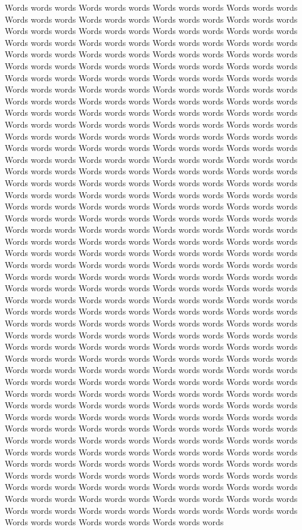 Words words words
Words words words
Words words words
Words words words
Words words words
Words words words
Words words words
Words words words
Words words words
Words words words
Words words words
Words words words
Words words words
Words words words
Words words words
Words words words
Words words words
Words words words
Words words words
Words words words
Words words words
Words words words
Words words words
Words words words
Words words words
Words words words
Words words words
Words words words
Words words words
Words words words
Words words words
Words words words
Words words words
Words words words
Words words words
Words words words
Words words words
Words words words
Words words words
Words words words
Words words words
Words words words
Words words words
Words words words
Words words words
Words words words
Words words words
Words words words
Words words words
Words words words
Words words words
Words words words
Words words words
Words words words
Words words words
Words words words
Words words words
Words words words
Words words words
Words words words
Words words words
Words words words
Words words words
Words words words
Words words words
Words words words
Words words words
Words words words
Words words words
Words words words
Words words words
Words words words
Words words words
Words words words
Words words words
Words words words
Words words words
Words words words
Words words words
Words words words
Words words words
Words words words
Words words words
Words words words
Words words words
Words words words
Words words words
Words words words
Words words words
Words words words
Words words words
Words words words
Words words words
Words words words
Words words words
Words words words
Words words words
Words words words
Words words words
Words words words
Words words words
Words words words
Words words words
Words words words
Words words words
Words words words
Words words words
Words words words
Words words words
Words words words
Words words words
Words words words
Words words words
Words words words
Words words words
Words words words
Words words words
Words words words
Words words words
Words words words
Words words words
Words words words
Words words words
Words words words
Words words words
Words words words
Words words words
Words words words
Words words words
Words words words
Words words words
Words words words
Words words words
Words words words
Words words words
Words words words
Words words words
Words words words
Words words words
Words words words
Words words words
Words words words
Words words words
Words words words
Words words words
Words words words
Words words words
Words words words
Words words words
Words words words
Words words words
Words words words
Words words words
Words words words
Words words words
Words words words
Words words words
Words words words
Words words words
Words words words
Words words words
Words words words
Words words words
Words words words
Words words words
Words words words
Words words words
Words words words
Words words words
Words words words
Words words words
Words words words
Words words words
Words words words
Words words words
Words words words
Words words words
Words words words
Words words words
